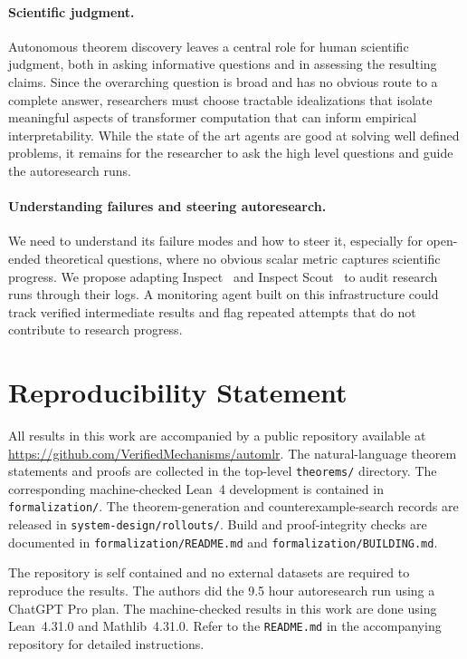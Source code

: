 \documentclass{article}
\theoremstyle{definition}
\theoremstyle{plain}
\begin{document}
\paragraph{Scientific judgment.}
Autonomous theorem discovery leaves a central role for human scientific judgment, both in asking informative questions and in assessing the resulting claims. Since the overarching question is broad and has no obvious route to a complete answer, researchers must choose tractable idealizations that isolate meaningful aspects of transformer computation that can inform empirical interpretability. While the state of the art agents are good at solving well defined problems, it remains for the researcher to ask the high level questions and guide the autoresearch runs.

\paragraph{Understanding failures and steering autoresearch.}
We need to understand its failure modes and how to steer it, especially for open-ended theoretical questions, where no obvious scalar metric captures scientific progress. We propose adapting Inspect~\citep{aisi2024inspect} and Inspect Scout~\citep{dubois2026loganalysis} to audit research runs through their logs. A monitoring agent built on this infrastructure could track verified intermediate results and flag repeated attempts that do not contribute to research progress.

\clearpage
\appendix
\section{Reproducibility Statement}
All results in this work are accompanied by a public repository available at \url{https://github.com/VerifiedMechanisms/automlr}. The natural-language theorem statements and proofs are collected in the top-level \texttt{theorems/} directory. The corresponding machine-checked Lean~4 development is contained in \texttt{formalization/}. The theorem-generation and counterexample-search records are released in \texttt{system-design/rollouts/}. Build and proof-integrity checks are documented in \texttt{formalization/README.md} and \texttt{formalization/BUILDING.md}.

The repository is self contained and no external datasets are required to reproduce the results. The authors did the 9.5 hour autoresearch run using a ChatGPT Pro plan. The machine-checked results in this work are done using Lean~4.31.0 and Mathlib~4.31.0. Refer to the \texttt{README.md} in the accompanying repository for detailed instructions. 
\end{document}
